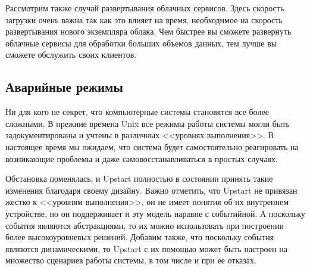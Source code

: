 Рассмотрим также случай развертывания облачных сервисов. Здесь скорость загрузки очень важна так как это влияет на время, необходимое на скорость развертывания нового экземпляра облака. Чем быстрее вы сможете развернуть облачные сервисы для обработки больших объемов данных, тем лучше вы сможете обслужить своих клиентов.
\subsection{Аварийные режимы}
Ни для кого не секрет, что компьютерные системы становятся все более сложными. В прежние времена Unix все режимы работы системы могли быть задокументированы и учтены в различных <<уровнях выполнения>>. В настоящее время мы ожидаем, что система будет самостоятельно реагировать на возникающие проблемы и даже самовосстанавливаться в простых случаях.

Обстановка поменялась, и Upstart полностью в состоянии принять такие изменения благодаря своему дизайну. Важно отметить, что Upstart не привязан жестко к <<уровням выполнения>>, он не имеет понятия об их внутреннем устройстве, но он поддерживает и эту модель наравне с событийной. А поскольку события являются абстракциями, то их можно использовать при построении более высокоуровневых решений. Добавим также, что поскольку события являются динамическими, то Upstart с их помощью может быть настроен на множество сценариев работы системы, в том числе и при ее отказах.
